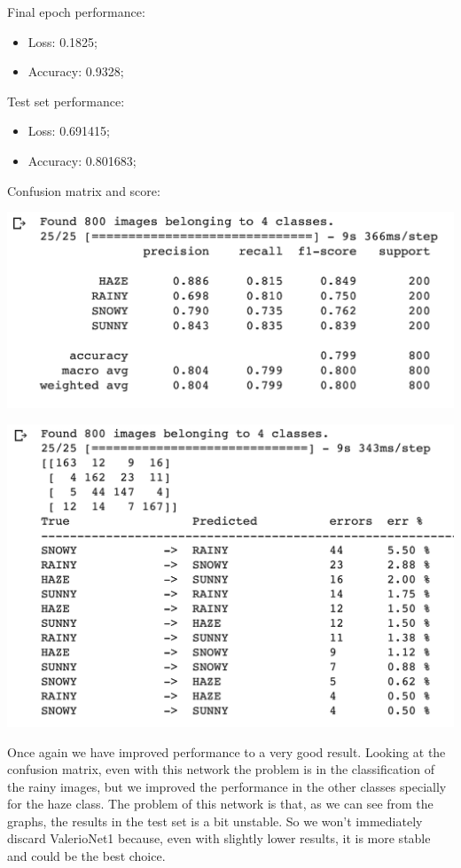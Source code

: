 \documentclass[12pt]{article}
\begin{document}
\newpage
Final epoch performance:
\begin{itemize}
    \item Loss: 0.1825;
    \item Accuracy: 0.9328;
\end{itemize}

Test set performance:
\begin{itemize}
    \item Loss: 0.691415;
    \item Accuracy: 0.801683;
\end{itemize}

Confusion matrix and score: \newline
\begin{minipage}[c]{.5\textwidth}
   \centering
   \includegraphics[width=\textwidth]{pic4}
\end{minipage}
\hspace{1em}
\begin{minipage}[c]{.5\textwidth}
   \centering
   \includegraphics[width=\textwidth]{pic5}
\end{minipage}

Once again we have improved performance to a very good result. Looking at the confusion matrix, even with this network the problem is in the classification of the rainy images, but we improved the performance in the other classes specially for the haze class. The problem of this network is that, as we can see from the graphs, the results in the test set is a bit unstable. So we won't immediately discard ValerioNet1 because, even with slightly lower results, it is more stable and could be the best choice.
\end{document}
